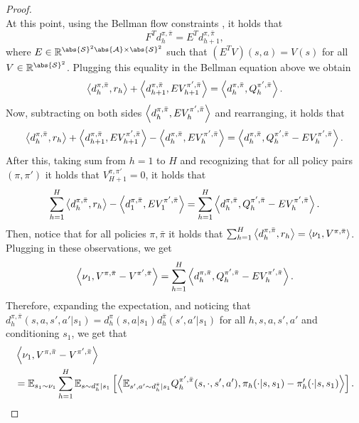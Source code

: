\begin{proof}
\begin{equation*}
\end{equation*}
At this point, using the Bellman flow constraints \cite{Puterman:1994}, it holds that
\begin{equation*}
     F^T d_h^{\pi, \bar{\pi}} = E^T d_{h+1}^{\pi, \bar{\pi}},
\end{equation*}
where $E \in \mathbb{R}^{\abs{\mathcal{S}}^2\abs{\mathcal{A}} \times \abs{\mathcal{S}}^2}$ such that $(E^T V)(s,a) = V(s) $ for all $V \in \mathbb{R}^{\abs{\mathcal{S}}^2}$.
Plugging this equality in the Bellman equation above we obtain
\begin{equation*}
\left\langle{d^{\pi, \bar{\pi}}_h},{r_h}\right\rangle + \left\langle{d_{h+1}^{\pi, \bar{\pi}}},{ E V_{h+1}^{\pi', \bar{\pi}}}\right\rangle = \left\langle{d_h^{\pi, \bar{\pi}}},{Q_h^{\pi', \bar{\pi}}}\right\rangle.
\end{equation*}
Now, subtracting on both sides $\left\langle{d_{h}^{\pi, \bar{\pi}}},{ E V_{h}^{\pi', \bar{\pi}}}\right\rangle$ and rearranging,  it holds that
\begin{equation*} \left\langle{d^{\pi, \bar{\pi}}_h},{r_h}\right\rangle + \left\langle{d_{h+1}^{\pi, \bar{\pi}}},{ E V_{h+1}^{\pi', \bar{\pi}}}\right\rangle - \left\langle{d_{h}^{\pi, \bar{\pi}}},{ E V_{h}^{\pi', \bar{\pi}}}\right\rangle = \left\langle{d_h^{\pi, \bar{\pi}}},{Q_h^{\pi', \bar{\pi}} - E V_h^{\pi', \bar{\pi}}}\right\rangle.
\end{equation*}
After this, taking sum from $h=1$ to $H$ and recognizing that for all policy pairs $(\pi,\pi')$ it holds that $V^{\pi,\pi'}_{H+1}=0$, it holds that
\begin{equation*} \sum^H_{h=1}\left\langle{d^{\pi, \bar{\pi}}_h},{r_h}\right\rangle - \left\langle{d_{1}^{\pi, \bar{\pi}}},{ E V_{1}^{\pi', \bar{\pi}}}\right\rangle = \sum^H_{h=1}\left\langle{d_h^{\pi, \bar{\pi}}},{Q_h^{\pi', \bar{\pi}} - E V_h^{\pi', \bar{\pi}}}\right\rangle.
\end{equation*}
Then, notice that for all policies $\pi, \bar{\pi}$ it holds that 
$\sum^H_{h=1}\left\langle{d^{\pi, \bar{\pi}}_h},{r_h}\right\rangle = \left\langle{\nu_1},{V^{\pi, \bar{\pi}}}\right\rangle$. Plugging in these observations, we get
\begin{equation*}
\left\langle{\nu_1},{V^{\pi, \bar{\pi}} -V^{\pi', \bar{\pi}}}\right\rangle =
\sum^H_{h=1}\left\langle{d_h^{\pi, \bar{\pi}}},{Q_h^{\pi', \bar{\pi}} - E V_h^{\pi', \bar{\pi}}}\right\rangle.
\end{equation*}
Therefore, expanding the expectation, and noticing that $d_h^{\pi, \bar{\pi}}(s,a,s',a'|s_1) = d_h^\pi(s,a|s_1)d_h^{\bar{\pi}}(s',a'|s_1)$ for all $h,s,a,s',a'$ and conditioning $s_1$, we get that
\begin{align*}
   & \left\langle{\nu_1},{V^{\pi, \bar{\pi}} -V^{\pi', \bar{\pi}}}\right\rangle 
    \\ &= \mathbb{E}_{s_1\sim\nu_1}\sum^H_{h=1}\mathbb{E}_{s \sim d_h^\pi |s_1}\left[{\left\langle{\mathbb{E}_{s',a' \sim d_h^{\bar{\pi}}|s_1}Q_h^{\pi', \bar{\pi}}(s,\cdot,s',a')},{\pi_h(\cdot|s,s_1) - \pi_h'(\cdot|s,s_1)}\right\rangle}\right].
\end{align*}
\end{proof}

